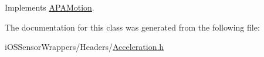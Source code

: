 Implements \hyperlink{class_a_p_a_motion_a79ca82357e31f95ed8de484a6e3e3882}{A\+P\+A\+Motion}.



The documentation for this class was generated from the following file\+:\begin{DoxyCompactItemize}
\item 
i\+O\+S\+Sensor\+Wrappers/\+Headers/\hyperlink{_acceleration_8h}{Acceleration.\+h}\end{DoxyCompactItemize}
